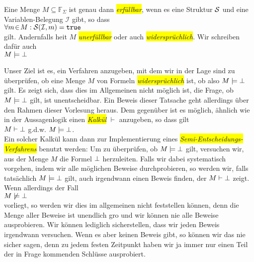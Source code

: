\begin{Definition}
    Eine Menge $M \subseteq \mathbb{F}_\Sigma$ ist genau dann \colorbox{yellow}{\emph{erf\"{u}llbar}},
    wenn es eine Struktur $\mathcal{S}$ und eine Variablen-Belegung $\mathcal{I}$ gibt, so dass 
      \\[0.2cm]
    \hspace*{1.3cm} $\forall m \!\in\! M: \mathcal{S}(\mathcal{I},m) = \mathtt{true}$ \\[0.2cm]
    gilt.  Andernfalls hei\3t $M$ \colorbox{yellow}{\emph{unerf\"{u}llbar}} oder auch \colorbox{yellow}{\emph{widerspr\"{u}chlich}}. 
    Wir schreiben daf\"{u}r auch \\[0.2cm]
    \hspace*{1.3cm} $M \models \bot$
    \eox
\end{Definition}

\noindent
Unser Ziel ist es, ein Verfahren anzugeben, mit dem wir in der Lage sind zu \"{u}berpr\"{u}fen,
ob eine Menge $M$ von Formeln \colorbox{yellow}{\emph{widerspr\"{u}chlich}} ist, ob also 
 $M \models \bot$ gilt.  Es zeigt sich, dass dies im Allgemeinen nicht
m\"{o}glich ist, die Frage, ob $M \models \bot$ gilt, ist unentscheidbar.  Ein Beweis
dieser Tatsache geht allerdings \"{u}ber den Rahmen dieser Vorlesung heraus.
Dem gegen\"{u}ber ist es m\"{o}glich, \"{a}hnlich wie in der Aussagenlogik
einen \colorbox{yellow}{\emph{Kalk\"{u}l}} $\vdash$ anzugeben, so dass gilt \\[0.2cm]
\hspace*{1.3cm} $M \vdash \bot$ \quad g.d.w. \quad $M \models \bot$. \\[0.2cm]
Ein solcher Kalk\"{u}l kann dann zur Implementierung eines
\colorbox{yellow}{\emph{Semi-Entscheidungs-Verfahrens}} benutzt werden:  Um zu \"{u}berpr\"{u}fen, ob
$M \models \bot$ gilt, versuchen wir, aus der Menge $M$ die Formel $\bot$
herzuleiten.  
Falls wir dabei systematisch vorgehen, indem wir alle m\"{o}glichen Beweise durchprobieren,
so werden wir, falls tats\"{a}chlich $M \models \bot$ gilt, auch irgendwann einen Beweis
finden, der $M \vdash \bot$ zeigt.   Wenn allerdings der Fall \\[0.2cm]
\hspace*{1.3cm}  $M \not\models \bot$ \\[0.2cm]
vorliegt,  so werden wir dies im allgemeinen nicht feststellen k\"{o}nnen, denn die Menge aller Beweise ist unendlich gro\3
und wir k\"{o}nnen nie alle Beweise ausprobieren.  Wir k\"{o}nnen lediglich sicherstellen, dass
wir jeden Beweis irgendwann versuchen.  Wenn es aber keinen Beweis gibt, so k\"{o}nnen wir das
nie sicher sagen, denn zu jedem festen Zeitpunkt haben wir ja immer nur einen Teil der in
Frage kommenden Schl\"{u}sse ausprobiert.

